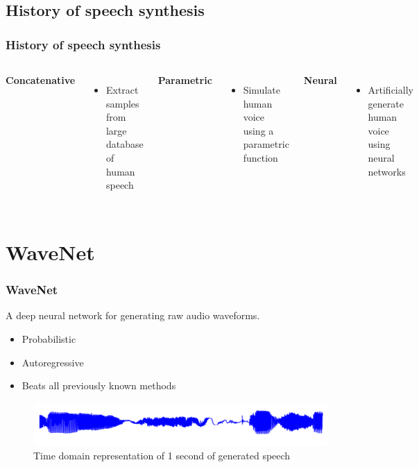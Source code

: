 \documentclass{beamer}
\begin{document}
  \subsection{History of speech synthesis}
  \begin{frame}
    \frametitle{History of speech synthesis }
      \begin{columns}
          \textbf{Concatenative}\\
          \begin{itemize}
            \item Extract samples from large database of human speech
          \end{itemize}

          \textbf{Parametric}\\
          \begin{itemize}
            \item Simulate human voice using a parametric function
          \end{itemize}

          \textbf{Neural}\\
          \begin{itemize}
            \item Artificially generate human voice using neural networks
          \end{itemize}
      \end{columns}
  \end{frame}

  \section{WaveNet}
  \begin{frame}
    \frametitle{WaveNet}
      A deep neural network for generating raw audio waveforms.

      \begin{itemize}
        \item Probabilistic 
        \item Autoregressive
        \item Beats all previously known methods
      \end{itemize}
      \begin{figure}
        \centering
        \includegraphics[width=\textwidth]{images/second_of_speech.png}
        \caption{Time domain representation of 1 second of generated speech}
      \end{figure}
  \end{frame}
\end{document}
